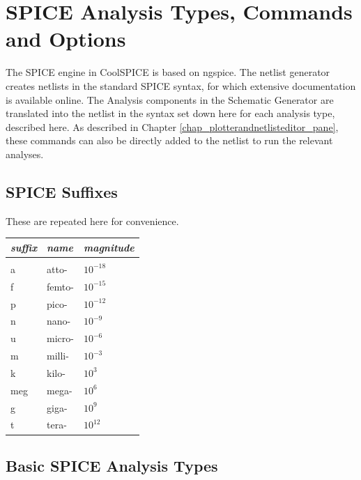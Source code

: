 \chapter{SPICE Analysis Types, Commands and Options}

\label{chap_spiceanalysistypesparametersandcommands_satco}


The SPICE engine in CoolSPICE is based on ngspice.  The netlist generator creates netlists in the standard SPICE syntax, for which extensive documentation is available online.   The Analysis components in the Schematic Generator are translated into the netlist in the syntax set down here for each analysis type, described here.  As described in Chapter \ref{chap_plotterandnetlisteditor_pane}, these commands can also be directly added to the netlist to run the relevant analyses.

\section{SPICE Suffixes}
\label{subsec_satco_suffixes}
These are repeated here for convenience.
\vspace{2\parskip}

\begin{tabular}{lll} 
\textit{suffix} & \textit{name} & \textit{magnitude} \\ \hline \\ \vspace{-0.8\parskip}
a & atto- & $10^{-18}$ \\
f & femto- & $10^{-15}$ \\
p & pico- & $10^{-12}$ \\
n & nano- & $10^{-9}$ \\
u & micro- & $10^{-6}$ \\
m & milli- & $10^{-3}$ \\
k & kilo- & $10^{3}$ \\
meg & mega- & $10^{6}$ \\
g & giga- & $10^{9}$ \\
t & tera- & $10^{12}$ \\
\end{tabular}

\clearpage

\section{Basic SPICE Analysis Types}
\label{sec_satco_basicspiceanalysistypes}

